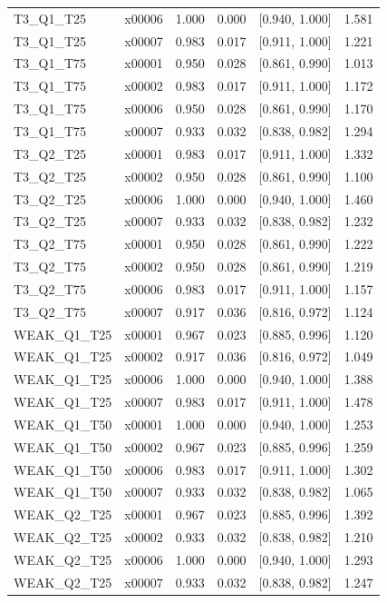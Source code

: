 \begin{longtable}{lrrrrr}
T3\_Q1\_T25 & x00006 & 1.000 & 0.000 & [0.940, 1.000] & 1.581 \\
T3\_Q1\_T25 & x00007 & 0.983 & 0.017 & [0.911, 1.000] & 1.221 \\
T3\_Q1\_T75 & x00001 & 0.950 & 0.028 & [0.861, 0.990] & 1.013 \\
T3\_Q1\_T75 & x00002 & 0.983 & 0.017 & [0.911, 1.000] & 1.172 \\
T3\_Q1\_T75 & x00006 & 0.950 & 0.028 & [0.861, 0.990] & 1.170 \\
T3\_Q1\_T75 & x00007 & 0.933 & 0.032 & [0.838, 0.982] & 1.294 \\
T3\_Q2\_T25 & x00001 & 0.983 & 0.017 & [0.911, 1.000] & 1.332 \\
T3\_Q2\_T25 & x00002 & 0.950 & 0.028 & [0.861, 0.990] & 1.100 \\
T3\_Q2\_T25 & x00006 & 1.000 & 0.000 & [0.940, 1.000] & 1.460 \\
T3\_Q2\_T25 & x00007 & 0.933 & 0.032 & [0.838, 0.982] & 1.232 \\
T3\_Q2\_T75 & x00001 & 0.950 & 0.028 & [0.861, 0.990] & 1.222 \\
T3\_Q2\_T75 & x00002 & 0.950 & 0.028 & [0.861, 0.990] & 1.219 \\
T3\_Q2\_T75 & x00006 & 0.983 & 0.017 & [0.911, 1.000] & 1.157 \\
T3\_Q2\_T75 & x00007 & 0.917 & 0.036 & [0.816, 0.972] & 1.124 \\
WEAK\_Q1\_T25 & x00001 & 0.967 & 0.023 & [0.885, 0.996] & 1.120 \\
WEAK\_Q1\_T25 & x00002 & 0.917 & 0.036 & [0.816, 0.972] & 1.049 \\
WEAK\_Q1\_T25 & x00006 & 1.000 & 0.000 & [0.940, 1.000] & 1.388 \\
WEAK\_Q1\_T25 & x00007 & 0.983 & 0.017 & [0.911, 1.000] & 1.478 \\
WEAK\_Q1\_T50 & x00001 & 1.000 & 0.000 & [0.940, 1.000] & 1.253 \\
WEAK\_Q1\_T50 & x00002 & 0.967 & 0.023 & [0.885, 0.996] & 1.259 \\
WEAK\_Q1\_T50 & x00006 & 0.983 & 0.017 & [0.911, 1.000] & 1.302 \\
WEAK\_Q1\_T50 & x00007 & 0.933 & 0.032 & [0.838, 0.982] & 1.065 \\
WEAK\_Q2\_T25 & x00001 & 0.967 & 0.023 & [0.885, 0.996] & 1.392 \\
WEAK\_Q2\_T25 & x00002 & 0.933 & 0.032 & [0.838, 0.982] & 1.210 \\
WEAK\_Q2\_T25 & x00006 & 1.000 & 0.000 & [0.940, 1.000] & 1.293 \\
WEAK\_Q2\_T25 & x00007 & 0.933 & 0.032 & [0.838, 0.982] & 1.247 \\
\bottomrule
\end{longtable}
